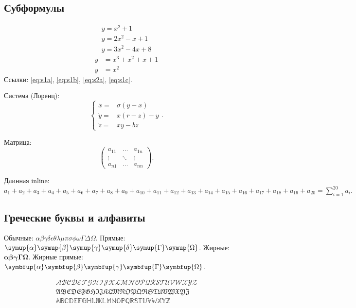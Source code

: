 \documentclass[font=modern]{cmcmsuthesis-master}
\begin{document}
\subsection{Субформулы}
\begin{subequations}\label{eq:sub1}\begin{gather}y=x^2+1\label{eq:s1a}\\y=2x^2-x+1\label{eq:s1b}\\y=3x^2-4x+8\label{eq:s1c}\end{gather}\end{subequations}
\begin{subequations}\label{eq:sub2}\begin{align}y&=x^3+x^2+x+1\label{eq:s2a}\\y&=x^2\label{eq:s2b}\end{align}\end{subequations}
Ссылки: \eqref{eq:s1a}, \eqref{eq:s1b}, \eqref{eq:s2a}, \eqref{eq:s1c}.

Система (Лоренц):
\[\left\{\begin{array}{rl}\dot x=&\sigma(y-x)\\\dot y=&x(r-z)-y\\\dot z=&xy-bz\end{array}\right..\]

Матрица:
\[\left(\begin{array}{ccc}a_{11}&\ldots&a_{1n}\\\vdots&\ddots&\vdots\\a_{n1}&\ldots&a_{nn}\end{array}\right).\]

Длинная inline: $a_1+a_2+a_3+a_4+a_5+a_6+a_7+a_8+a_9+a_{10}+a_{11}+a_{12}+a_{13}+a_{14}+a_{15}+a_{16}+a_{17}+a_{18}+a_{19}+a_{20}=\sum_{i=1}^{20}a_i.$

\subsection{Греческие буквы и алфавиты}
Обычные: $\alpha\beta\gamma\delta\epsilon\theta\lambda\mu\pi\sigma\phi\omega\Gamma\Delta\Omega$.
Прямые: $\symup{\alpha}\symup{\beta}\symup{\gamma}\symup{\delta}\symup{\Gamma}\symup{\Omega}$.
Жирные: $\symbf{\alpha}\symbf{\beta}\symbf{\gamma}\symbf{\Gamma}\symbf{\Omega}$.
Жирные прямые: $\symbfup{\alpha}\symbfup{\beta}\symbfup{\gamma}\symbfup{\Gamma}\symbfup{\Omega}$.

\[\begin{aligned}\mathcal{ABCDEFGHIJKLMNOPQRSTUVWXYZ}\\\mathfrak{ABCDEFGHIJKLMNOPQRSTUVWXYZ}\\\mathbb{ABCDEFGHIJKLMNOPQRSTUVWXYZ}\end{aligned}\]
\end{document}
